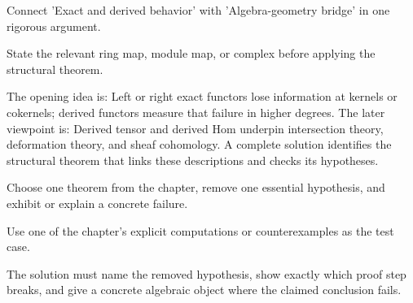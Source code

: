 \begin{exercise}\label{exr:v28-expand-15}
Connect 'Exact and derived behavior' with 'Algebra-geometry bridge' in one rigorous argument.
\end{exercise}
\begin{hint}
State the relevant ring map, module map, or complex before applying the structural theorem.
\end{hint}
\begin{solution}
The opening idea is: Left or right exact functors lose information at kernels or cokernels; derived functors measure that failure in higher degrees. The later viewpoint is: Derived tensor and derived Hom underpin intersection theory, deformation theory, and sheaf cohomology. A complete solution identifies the structural theorem that links these descriptions and checks its hypotheses.
\end{solution}

\begin{exercise}\label{exr:v28-expand-16}
Choose one theorem from the chapter, remove one essential hypothesis, and exhibit or explain a concrete failure.
\end{exercise}
\begin{hint}
Use one of the chapter's explicit computations or counterexamples as the test case.
\end{hint}
\begin{solution}
The solution must name the removed hypothesis, show exactly which proof step breaks, and give a concrete algebraic object where the claimed conclusion fails.
\end{solution}


